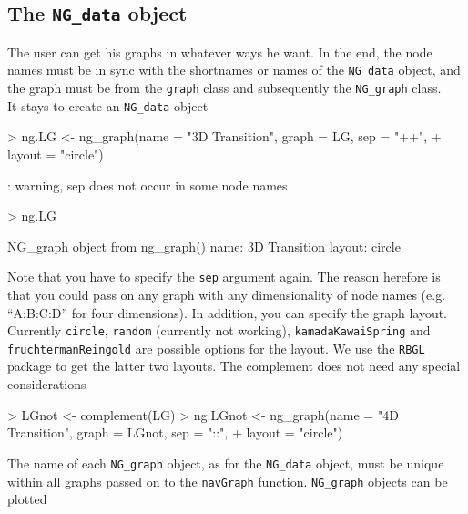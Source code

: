 \documentclass[12pt,oneside,titlepage,letter]{article}
\newcommand{\modify}[1]{{\color{blue}#1}}
\begin{document}
\subsection{The \texttt{NG\_data} object}
The user can get his graphs in whatever ways he want. In the end, the node names must be in sync with the shortnames or names of the \texttt{NG\_data} object, and the graph must be from the \texttt{graph} class and subsequently the \texttt{NG\_graph} class.\\

It stays to create an \texttt{NG\_data} object

\begin{Schunk}
\begin{Sinput}
> ng.LG <- ng_graph(name = "3D Transition", graph = LG, sep = "++", 
+     layout = "circle")
\end{Sinput}
\begin{Soutput}
[ng_graph]: warning, sep does not occur in some node names
\end{Soutput}
\begin{Sinput}
> ng.LG
\end{Sinput}
\begin{Soutput}
NG_graph object from ng_graph()
name: 3D Transition 
layout: circle 
\end{Soutput}
\end{Schunk}
Note that you have to specify the \texttt{sep} argument again. The reason herefore is that you could pass on any graph with any dimensionality of node names (e.g. ``A:B:C:D'' for four dimensions). In addition, you can specify the graph layout. Currently \texttt{circle}, \texttt{random} \modify{(currently not working)}, \texttt{kamadaKawaiSpring} and \texttt{fruchtermanReingold} are possible options for the layout. We use the \texttt{RBGL} package to get the latter two layouts. The complement does not need any special considerations
\begin{Schunk}
\begin{Sinput}
> LGnot <- complement(LG)
> ng.LGnot <- ng_graph(name = "4D Transition", graph = LGnot, sep = "::", 
+     layout = "circle")
\end{Sinput}
\end{Schunk}
The name of each \texttt{NG\_graph} object, as for the \texttt{NG\_data} object, must be unique within all graphs passed on to the \texttt{navGraph} function. \texttt{NG\_graph} objects can be plotted
\end{document}
